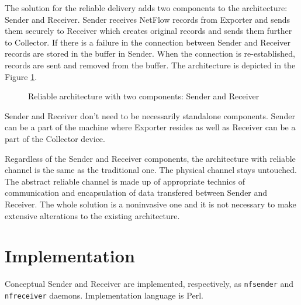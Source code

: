 \documentclass[11pt,a4paper]{article}
\begin{document}
The solution for the reliable delivery adds two components to the architecture: Sender and Receiver. Sender receives NetFlow records from Exporter and sends them securely to Receiver which creates original records and sends them further to Collector. If there is a failure in the connection between Sender and Receiver records are stored in the buffer in Sender. When the connection is re-established, records are sent and removed from the buffer. The architecture is depicted in the Figure \ref{reliable-arch}.

\begin{figure}[h]
  \begin{center}
    \caption{Reliable architecture with two components: Sender and Receiver}
    \label{reliable-arch}
  \end{center}
\end{figure}

Sender and Receiver don't need to be necessarily standalone components. Sender can be a part of the machine where Exporter resides as well as Receiver can be a part of the Collector device.

Regardless of the Sender and Receiver components, the architecture with reliable channel is the same as the traditional one. The physical channel stays untouched. The abstract reliable channel is made up of appropriate technics of communication and encapsulation of data transfered between Sender and Receiver. The whole solution is a noninvasive one and it is not necessary to make extensive alterations to the existing architecture.

\section{Implementation}

Conceptual Sender and Receiver are implemented, respectively, as \texttt{nf\textunderscore sender} and \texttt{nf\textunderscore receiver} daemons. Implementation language is Perl.
\end{document}
